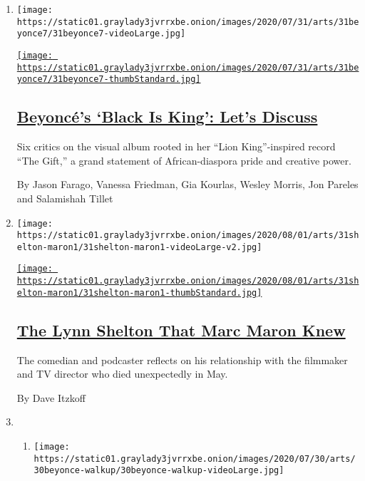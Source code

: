 \begin{enumerate}
\def\labelenumi{\arabic{enumi}.}
\item
  \texttt{[image: https://static01.graylady3jvrrxbe.onion/images/2020/07/31/arts/31beyonce7/31beyonce7-videoLarge.jpg]}

  \href{/2020/07/31/arts/music/beyonce-black-is-king.html}{\texttt{[image: https://static01.graylady3jvrrxbe.onion/images/2020/07/31/arts/31beyonce7/31beyonce7-thumbStandard.jpg]}}

  \hypertarget{beyoncuxe9s-black-is-king-lets-discuss}{%
  \subsection{\texorpdfstring{\href{/2020/07/31/arts/music/beyonce-black-is-king.html}{Beyoncé's
  `Black Is King': Let's
  Discuss}}{Beyoncé's `Black Is King': Let's Discuss}}\label{beyoncuxe9s-black-is-king-lets-discuss}}

  Six critics on the visual album rooted in her ``Lion King''-inspired
  record ``The Gift,'' a grand statement of African-diaspora pride and
  creative power.

  By Jason Farago, Vanessa Friedman, Gia Kourlas, Wesley Morris, Jon
  Pareles and Salamishah Tillet
\item
  \texttt{[image: https://static01.graylady3jvrrxbe.onion/images/2020/08/01/arts/31shelton-maron1/31shelton-maron1-videoLarge-v2.jpg]}

  \href{/2020/07/31/movies/marc-maron-lynn-shelton.html}{\texttt{[image: https://static01.graylady3jvrrxbe.onion/images/2020/08/01/arts/31shelton-maron1/31shelton-maron1-thumbStandard.jpg]}}

  \hypertarget{the-lynn-shelton-that-marc-maron-knew}{%
  \subsection{\texorpdfstring{\href{/2020/07/31/movies/marc-maron-lynn-shelton.html}{The
  Lynn Shelton That Marc Maron
  Knew}}{The Lynn Shelton That Marc Maron Knew}}\label{the-lynn-shelton-that-marc-maron-knew}}

  The comedian and podcaster reflects on his relationship with the
  filmmaker and TV director who died unexpectedly in May.

  By Dave Itzkoff
\item
  \begin{enumerate}
  \def\labelenumii{\arabic{enumii}.}
  \item
    \texttt{[image: https://static01.graylady3jvrrxbe.onion/images/2020/07/30/arts/30beyonce-walkup/30beyonce-walkup-videoLarge.jpg]}


\end{enumerate}
\end{enumerate}

